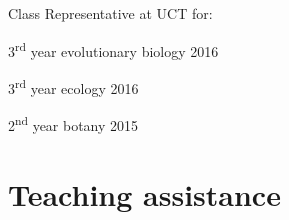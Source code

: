 \documentclass[10pt]{article}
\begin{document}
Class Representative at UCT for:

\hspace{2em} 3\textsuperscript{rd} year evolutionary biology         \hfill 2016

\hspace{2em} 3\textsuperscript{rd} year ecology                      \hfill 2016

\hspace{2em} 2\textsuperscript{nd} year botany                       \hfill 2015

\clearpage %

\section*{Teaching assistance} %

\end{document}
